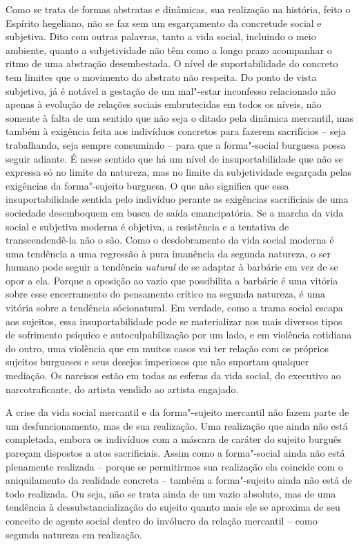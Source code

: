 Como se trata de formas abstratas e dinâmicas, sua realização na
história, feito o Espírito hegeliano, não se faz sem um esgarçamento da
concretude social e subjetiva. Dito com outras palavras, tanto a vida
social, incluindo o meio ambiente, quanto a subjetividade não têm como a
longo prazo acompanhar o ritmo de uma abstração desembestada. O nível de
suportabilidade do concreto tem limites que o movimento do abstrato não
respeita. Do ponto de vista subjetivo, já é notável a gestação de um
mal"-estar inconfesso relacionado não apenas à evolução de relações
sociais embrutecidas em todos os níveis, não somente à falta de um
sentido que não seja o ditado pela dinâmica mercantil, mas também à
exigência feita aos indivíduos concretos para fazerem sacrifícios --
seja trabalhando, seja sempre consumindo -- para que a forma"-social
burguesa possa seguir adiante. É nesse sentido que há um nível de
insuportabilidade que não se expressa só no limite da natureza, mas no
limite da subjetividade esgarçada pelas exigências da forma"-sujeito
burguesa. O que não significa que essa insuportabilidade sentida pelo
indivíduo perante as exigências sacrificiais de uma sociedade
desemboquem em busca de saída emancipatória. Se a marcha da vida social
e subjetiva moderna é objetiva, a resistência e a tentativa de
transcendendê-la não o são. Como o desdobramento da vida social moderna
é uma tendência a uma regressão à pura imanência da segunda natureza, o
ser humano pode seguir a tendência \emph{natural} de se adaptar à
barbárie em vez de se opor a ela. Porque a oposição ao vazio que
possibilita a barbárie é uma vitória sobre esse encerramento do
pensamento crítico na segunda natureza, é uma vitória sobre a tendência
sócionatural. Em verdade, como a trama social escapa aos sujeitos,
essa insuportabilidade pode se materializar nos mais diversos tipos de
sofrimento psíquico e autoculpabilização por um lado, e em violência
cotidiana do outro, uma violência que em muitos casos vai ter relação
com os próprios sujeitos burgueses e seus desejos imperiosos que não
suportam qualquer mediação. Os narcisos estão em todas as esferas da
vida social, do executivo ao narcotraficante, do artista vendido ao
artista engajado.

A crise da vida social mercantil e da
forma"-sujeito mercantil não fazem parte de um desfuncionamento, mas de
sua realização. Uma realização que ainda não está completada, embora os
indivíduos com a máscara de caráter do sujeito burguês pareçam dispostos
a atos sacrificiais. Assim como a forma"-social ainda
não está plenamente realizada -- porque se permitirmos sua realização
ela coincide com o aniquilamento da realidade concreta -- também a
forma"-sujeito ainda não está de todo realizada. Ou seja, não se trata
ainda de um vazio absoluto, mas de uma tendência à dessubstancialização
do sujeito quanto mais ele se aproxima de seu conceito de agente social
dentro do invólucro da relação mercantil -- como segunda natureza em
realização.

